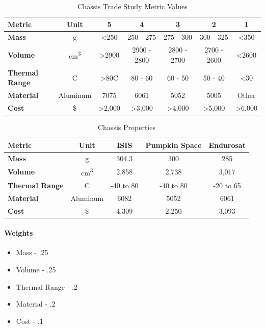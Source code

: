 \begin{table}[H]
\centering
\begin{tabular}{|l|c|c|c|c|c|c|} 
\hline
    \textbf{Metric} & \textbf{Unit} &  \textbf{5} & \textbf{4} & \textbf{3} & \textbf{2} & \textbf{1}
    \\
\hline
    \textbf{Mass} & g & <250 & 250 - 275 & 275 - 300 & 300 - 325 & <350
    \\
\hline
    \textbf{Volume} & cm\textsuperscript{3} & >2900 & 2900 - 2800 & 2800 - 2700 & 2700 - 2600 & <2600
    \\
\hline
    \textbf{Thermal Range} & C & >80C & 80 - 60 & 60 - 50 & 50 - 40 & <30
    \\
\hline
    \textbf{Material} & Aluminum & 7075 & 6061 & 5052 & 5005 & Other
    \\
\hline
    \textbf{Cost} & \$ & >2,000 & >3,000 & >4,000 & >5,000 & >6,000
    \\

\hline
\end{tabular}
\caption{Chassis Trade Study Metric Values}
\label{tbl:chassis_Metric_Scores}
\end{table}

\begin{table}[H]
\centering
\begin{tabular}{|l|c|c|c|c|} 
\hline
    \textbf{Metric} & \textbf{Unit} & \textbf{ISIS} & \textbf{Pumpkin Space} & \textbf{Endurosat}
    \\
\hline
    \textbf{Mass} & g & 304.3 & 300 & 285
    \\
\hline
    \textbf{Volume} & cm\textsuperscript{3} & 2,858 & 2,738 & 3,017
    \\
\hline
    \textbf{Thermal Range} & C & -40 to 80 & -40 to 80 & -20 to 65
    \\
\hline
    \textbf{Material} & Aluminum & 6082 & 5052 & 6061
    \\
\hline
    \textbf{Cost} & \$ & 4,309 & 2,250 & 3,093
    \\
\hline
\end{tabular}
\caption{Chassis Properties\cite{isis2}\cite{enduro_sat}\cite{pumpkin_space}}
\label{tbl:chassis_Props}
\end{table}

\paragraph{Weights}
\begin{itemize}
    \item Mass - .25
    \item Volume - .25
    \item Thermal Range - .2
    \item Material - .2
    \item Cost - .1
\end{itemize}

